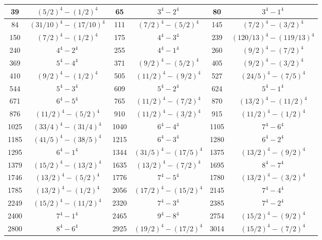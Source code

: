 \documentclass[a4paper,12pt,english,reqno]{amsart}
\begin{document}
\begin{table}
\begin{center}
\begin{tabular}{|c|c||c|c||c|c|}
39 &$(5/2)^4 -(1/2)^4$ & 65& $3^4-  2^4$ & 80 &$3^4  -1^4$ \\\hline
84 &$(31/10)^4-(17/10)^4$ & 111 & $(7/2)^4-(5/2)^4$ & 145& $(7/2)^4-(3/2)^4$ \\\hline
150 &$(7/2)^4-(1/2)^4$ & 175& $4^4-3^4$ & 239 & $(120/13)^4-(119/13)^4$ \\\hline
240 & $4^4-2^4$ &
 255 &$4^4-1^4$ &
260 &$(9/2)^4-(7/2)^4$  \\\hline
369 &$5^4 - 4^4$ & 
 371& $(9/2)^4-(5/2)^4$ & 
 405 &$(9/2)^4-(3/2)^4$ \\\hline
410 &$(9/2)^4-(1/2)^4$ &
505& $ (11/2)^4-(9/2)^4$ &
527 &$(24/5)^4-(7/5)^4$ \\\hline
544& $5^4-  3^4$ & 609 & $5^4-2^4$ &
624& $5^4  -1^4$ \\\hline
671& $6^4 - 5^4$ &
765 &$(11/2)^4  -(7/2)^4$ &
870& $(13/2)^4  -(11/2)^4$ \\\hline
876 &$(11/2)^4-( 5/2)^4$ &
910 &$(11/2)^4 -( 3/2)^4$ & 915 &$(11/2)^4 -(1/2)^4$ \\\hline
1025& $(33/4)^4-(31/4)^4$ &
1040& $6^4 -4^4$ &
1105 &$ 7^4 -6^4$ \\\hline
1185 &$(41/5)^4  -(38/5)^4$ &
1215 &$6^4  -3^4$ &
1280 &$6^4- 2^4$ \\\hline
1295 & $6^4- 1^4$ & %
1344 &$ (31/5)^4-(17/5)^4$  &
1375& $(13/2)^4-( 9/2)^4$ \\\hline %
1379 &$(15/2)^4-(13/2)^4$ &
1635& $(13/2)^4 -(7/2)^4$ &
1695 &$8^4- 7^4$  \\\hline
1746& $(13/2)^4-( 5/2)^4$ &
1776 &$7^4-5^4$ &
1780 &$(13/2)^4-(3/2)^4$  \\\hline
1785& $(13/2)^4  -(1/2)^4$ &  %
2056 & $(17/2)^4-(15/2)^4$  &
2145& $7^4-  4^4$  \\\hline
2249& $(15/2)^4  -(11/2)^4$ & %
2320 &$7^4-3^4$ &
2385 & $7^4  -2^4 $   \\\hline
2400 &$7^4 -1^4$ &
2465 &$9^4-  8^4$  & %
2754& $(15/2)^4-(9/2)^4$ \\\hline
2800& $8^4 -6^4$& 
2925 & $(19/2)^4-(17/2)^4$ & %
3014& $(15/2)^4 -(7/2)^4$  \\\hline

\end{tabular}
\end{center}
\end{table}
\end{document}
